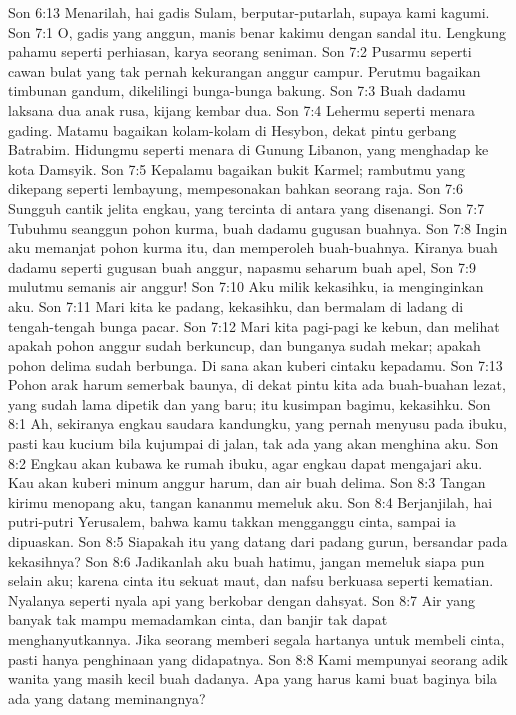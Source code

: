 Son 6:13  Menarilah, hai gadis Sulam, berputar-putarlah, supaya kami kagumi.
Son 7:1  O, gadis yang anggun, manis benar kakimu dengan sandal itu. Lengkung pahamu seperti perhiasan, karya seorang seniman.
Son 7:2  Pusarmu seperti cawan bulat yang tak pernah kekurangan anggur campur. Perutmu bagaikan timbunan gandum, dikelilingi bunga-bunga bakung.
Son 7:3  Buah dadamu laksana dua anak rusa, kijang kembar dua.
Son 7:4  Lehermu seperti menara gading. Matamu bagaikan kolam-kolam di Hesybon, dekat pintu gerbang Batrabim. Hidungmu seperti menara di Gunung Libanon, yang menghadap ke kota Damsyik.
Son 7:5  Kepalamu bagaikan bukit Karmel; rambutmu yang dikepang seperti lembayung, mempesonakan bahkan seorang raja.
Son 7:6  Sungguh cantik jelita engkau, yang tercinta di antara yang disenangi.
Son 7:7  Tubuhmu seanggun pohon kurma, buah dadamu gugusan buahnya.
Son 7:8  Ingin aku memanjat pohon kurma itu, dan memperoleh buah-buahnya. Kiranya buah dadamu seperti gugusan buah anggur, napasmu seharum buah apel,
Son 7:9  mulutmu semanis air anggur!
Son 7:10  Aku milik kekasihku, ia menginginkan aku.
Son 7:11  Mari kita ke padang, kekasihku, dan bermalam di ladang di tengah-tengah bunga pacar.
Son 7:12  Mari kita pagi-pagi ke kebun, dan melihat apakah pohon anggur sudah berkuncup, dan bunganya sudah mekar; apakah pohon delima sudah berbunga. Di sana akan kuberi cintaku kepadamu.
Son 7:13  Pohon arak harum semerbak baunya, di dekat pintu kita ada buah-buahan lezat, yang sudah lama dipetik dan yang baru; itu kusimpan bagimu, kekasihku.
Son 8:1  Ah, sekiranya engkau saudara kandungku, yang pernah menyusu pada ibuku, pasti kau kucium bila kujumpai di jalan, tak ada yang akan menghina aku.
Son 8:2  Engkau akan kubawa ke rumah ibuku, agar engkau dapat mengajari aku. Kau akan kuberi minum anggur harum, dan air buah delima.
Son 8:3  Tangan kirimu menopang aku, tangan kananmu memeluk aku.
Son 8:4  Berjanjilah, hai putri-putri Yerusalem, bahwa kamu takkan mengganggu cinta, sampai ia dipuaskan.
Son 8:5  Siapakah itu yang datang dari padang gurun, bersandar pada kekasihnya?
Son 8:6  Jadikanlah aku buah hatimu, jangan memeluk siapa pun selain aku; karena cinta itu sekuat maut, dan nafsu berkuasa seperti kematian. Nyalanya seperti nyala api yang berkobar dengan dahsyat.
Son 8:7  Air yang banyak tak mampu memadamkan cinta, dan banjir tak dapat menghanyutkannya. Jika seorang memberi segala hartanya untuk membeli cinta, pasti hanya penghinaan yang didapatnya.
Son 8:8  Kami mempunyai seorang adik wanita yang masih kecil buah dadanya. Apa yang harus kami buat baginya bila ada yang datang meminangnya?
